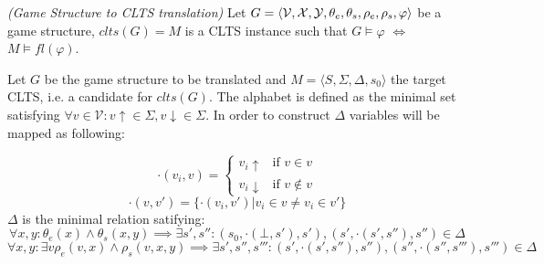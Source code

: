 \begin{definition}
	\label{def:gs_to_clts_translation} \emph{(Game Structure to CLTS translation)} 
Let $G =  \langle {\mathcal{V}}, {\mathcal{X}}, {\mathcal{Y}}, {\theta_e}, {\theta_s}, {\rho_e}, {\rho_s}, \varphi \rangle$ be a game structure, $clts(G)=M$ is a CLTS instance such that $G \models \varphi$ $\iff$ $M \models fl(\varphi)$.
\end{definition}

Let $G$ be the game structure to be translated and $M=\langle S, \Sigma, \Delta, s_0 \rangle$ the target CLTS, i.e. a candidate for $clts(G)$.  The alphabet is defined as the minimal set satisfying 
$\forall v \in \mathcal{V}: v\uparrow \in \Sigma, v\downarrow \in \Sigma$. 
In order to construct $\Delta$ variables will be mapped as following:

\[
\cdot(v_i,v) = \begin{cases}
v_i\uparrow & \text{if } v \in v \\
v_i\downarrow & \text{if } v \not\in v
\end{cases}
\]
\[\cdot(v,v') = \lbrace \cdot (v_i,v') | v_i \in v \neq v_i \in v' \rbrace \]
$\Delta$ is the minimal relation satifying:
	\[
	\forall x, y: \theta_e(x) \wedge \theta_s(x,y) \implies \exists s',s'' : (s_0, \cdot (\bot, s'), s'), (s', \cdot (s',s''), s'') \in \Delta 
	\] 
	\[
	\forall x, y : \exists v \rho_e(v,x) \wedge \rho_s(v,x,y) \implies \exists s',s'',s''' : (s', \cdot (s',s''), s''), (s'', \cdot (s'',s'''), s''') \in \Delta 
	\] 


